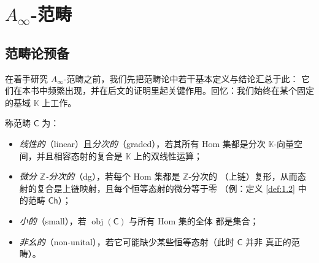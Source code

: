 \section{$A_\infty$-范畴}\label{ch:02}


\subsection{范畴论预备}\label{sec:2.1}

在着手研究 $A_\infty$-范畴之前，我们先把范畴论中若干基本定义与结论汇总于此：
它们在本书中频繁出现，并在后文的证明里起关键作用。回忆：我们始终在某个固定的基域
$\mathbb K$ 上工作。

\begin{Def}\label{def:2.1}
称范畴 $\mathsf C$ 为：
\begin{itemize}
  \item \emph{线性的}（linear）且\emph{分次的}（graded），若其所有 Hom 集都是分次
        $\mathbb K$-向量空间，并且相容态射的复合是 $\mathbb K$ 上的双线性运算；
  \item \emph{微分 $\mathbb Z$-分次的}（dg），若每个 Hom 集都是 $\mathbb Z$-分次的
        （上链）复形，从而态射的复合是上链映射，且每个恒等态射的微分等于零
        （例：定义 \ref{def:1.2} 中的范畴 $\mathsf{Ch}$）；
  \item \emph{小的}（small），若 $\operatorname{obj}(\mathsf C)$ 与所有 Hom 集的全体
        都是集合；
  \item \emph{非幺的}（non-unital），若它可能缺少某些恒等态射（此时 $\mathsf C$ 并非
        真正的范畴）。
\end{itemize}
\end{Def}

